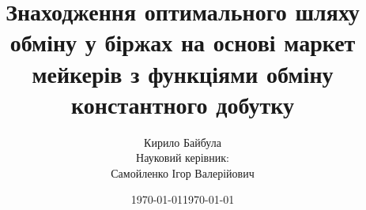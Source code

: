 \documentclass{beamer}
\author{Кирило Байбула\\
        Науковий керівник:\\
        Самойленко Ігор Валерійович}
\date{\today}
\title{Знаходження оптимального шляху обміну у біржах на основі маркет мейкерів з функціями обміну константного добутку}
\institute{\textbf{КНУ ім. Тараса Шевченка}}
\date{\today}
\begin{document}
\begin{frame}
\titlepage{}
\end{frame}







\end{document}
